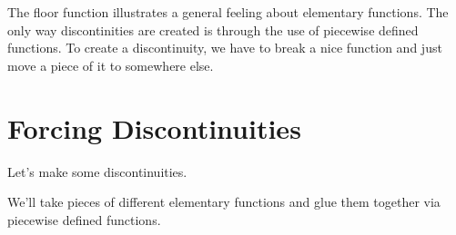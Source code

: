 \documentclass{ximera}
\begin{document}
The floor function illustrates a general feeling about elementary functions. The only way discontinities are created is through the use of piecewise defined functions.  To create a discontinuity, we have to break a nice function and just move a piece of it to somewhere else.











\section*{Forcing Discontinuities}



Let's make some discontinuities.

We'll take pieces of different elementary functions and glue them together via piecewise defined functions. 
\end{document}
